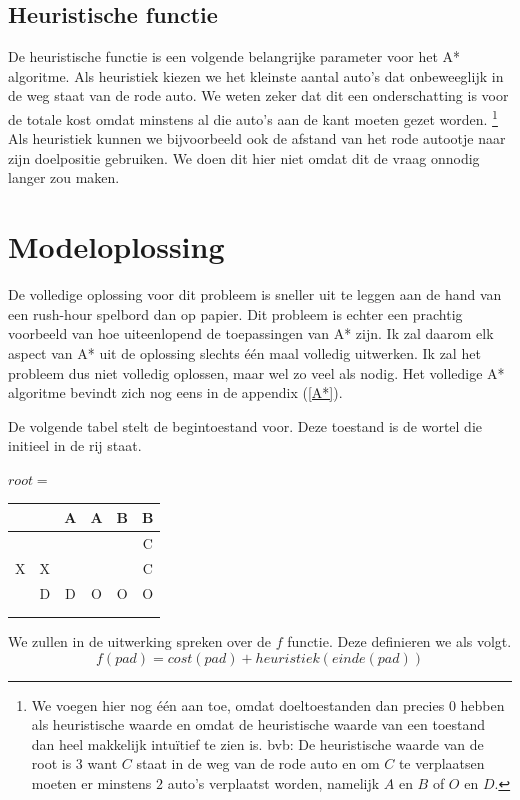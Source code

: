 \documentclass[alternative-exam.tex]{subfiles}
\begin{document}
\subsection{Heuristische functie} De heuristische functie is een volgende belangrijke parameter voor het A* algoritme. Als heuristiek kiezen we het kleinste aantal auto's dat onbeweeglijk in de weg staat van de rode auto. We weten zeker dat dit een onderschatting is voor de totale kost omdat minstens al die auto's aan de kant moeten gezet worden. \footnote{We voegen hier nog \'e\'en aan toe, omdat doeltoestanden dan precies $0$ hebben als heuristische waarde en omdat de heuristische waarde van een toestand dan heel makkelijk intu\"itief te zien is. bvb: De heuristische waarde van de root is $3$ want $C$ staat in de weg van de rode auto en om $C$ te verplaatsen moeten er minstens $2$ auto's verplaatst worden, namelijk $A$ en $B$ of $O$ en $D$.}
Als heuristiek kunnen we bijvoorbeeld ook de afstand van het rode autootje naar zijn doelpositie gebruiken. We doen dit hier niet omdat dit de vraag onnodig langer zou maken.

\section{Modeloplossing}
De volledige oplossing voor dit probleem is sneller uit te leggen aan de hand van een rush-hour spelbord dan op papier. Dit probleem is echter een prachtig voorbeeld van hoe uiteenlopend de toepassingen van A* zijn. Ik zal daarom elk aspect van A* uit de oplossing slechts \'e\'en maal volledig uitwerken. Ik zal het probleem dus niet volledig oplossen, maar wel zo veel als nodig. Het volledige A* algoritme bevindt zich nog eens in de appendix (\ref{A*}).

De volgende tabel stelt de begintoestand voor. Deze toestand is de wortel die initieel in de rij staat.
\begin{center}
$root = $
\begin{tabular}{| c | c | c | c | c | c |}
\hline
   &   & A & A & B & B \\ \hline
   &   &   &   &   & C \\ \hline
 X & X &   &   &   & C \\ \hline
   & D & D & O & O & O \\ \hline
   &   &   &   &   &   \\ \hline
   &   &   &   &   &   \\
\hline
\end{tabular}
\end{center}
We zullen in de uitwerking spreken over de $f$ functie. Deze definieren we als volgt.
\[
f(pad) = cost(pad) + heuristiek(einde(pad))
\]
\end{document}
